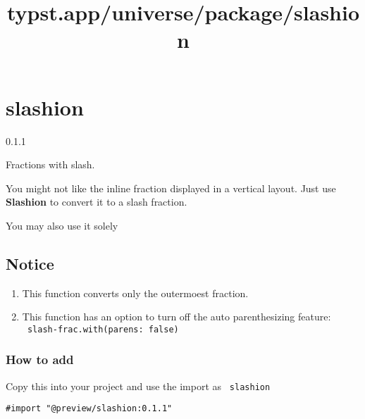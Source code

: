 \title{typst.app/universe/package/slashion}

\label{banner}
\section{slashion}\label{slashion}

{ 0.1.1 }

Fractions with slash.

\label{readme}
You might not like the inline fraction displayed in a vertical layout.
Just use \textbf{Slashion} to convert it to a slash fraction.

\begin{Shaded}
\begin{Highlighting}[]
\end{Highlighting}
\end{Shaded}

You may also use it solely

\begin{Shaded}
\begin{Highlighting}[]
\end{Highlighting}
\end{Shaded}

\subsection{Notice}\label{notice}

\begin{enumerate}
\tightlist
\item
  This function converts only the outermoest fraction.
\item
  This function has an option to turn off the auto parenthesizing
  feature: \texttt{\ slash-frac.with(parens:\ false)\ }
\end{enumerate}

\subsubsection{How to add}\label{how-to-add}

Copy this into your project and use the import as \texttt{\ slashion\ }

\begin{verbatim}
#import "@preview/slashion:0.1.1"
\end{verbatim}


